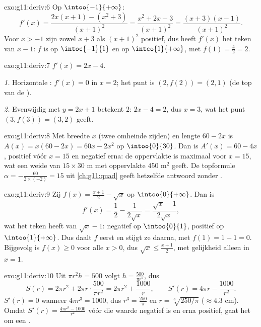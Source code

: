 \begin{solution}{exo:g11:deriv:6}
Op $\intoo{-1}{+\infty}$:
\[
f'(x) = \frac{2x(x+1) - (x^2+3)}{(x+1)^2}
= \frac{x^2 + 2x - 3}{(x+1)^2}
= \frac{(x+3)(x-1)}{(x+1)^2}.
\]
Voor $x > -1$ zijn zowel $x + 3$ als $(x+1)^2$ positief, dus heeft $f'(x)$
het teken van $x - 1$: $f$ is  op $\intoc{-1}{1}$ en  op
$\intco{1}{+\infty}$, met  $f(1) = \frac{4}{2} = 2$.
\end{solution}

\begin{solution}{exo:g11:deriv:7}
$f'(x) = 2x - 4$.

\emph{1.} Horizontale : $f'(x) = 0$ in $x = 2$; het punt is
$(2, f(2)) = (2, 1)$ (de top van de ).

\emph{2.} Evenwijdig met $y = 2x + 1$ betekent  $2$:
$2x - 4 = 2$, dus $x = 3$, wat het punt $(3, f(3)) = (3, 2)$ geeft.
\end{solution}

\begin{solution}{exo:g11:deriv:8}
Met breedte $x$ (twee omheinde zijden) en lengte $60 - 2x$ is
$A(x) = x(60 - 2x) = 60x - 2x^2$ op $\intoo{0}{30}$. Dan is
$A'(x) = 60 - 4x$, positief vóór $x = 15$ en negatief erna: de oppervlakte
is maximaal voor $x = 15$, wat een weide van $15 \times 30$ m met
oppervlakte $450$ m$^2$ geeft. De topformule
$\alpha = -\frac{60}{2 \times (-2)} = 15$ uit \cref{ch:g11:quad} geeft
hetzelfde antwoord zonder .
\end{solution}

\begin{solution}{exo:g11:deriv:9}
Zij $f(x) = \frac{x+1}{2} - \sqrt x$ op $\intoo{0}{+\infty}$. Dan is
\[
f'(x) = \frac12 - \frac{1}{2\sqrt x} = \frac{\sqrt x - 1}{2\sqrt x},
\]
wat het teken heeft van $\sqrt x - 1$: negatief op $\intoo{0}{1}$, positief
op $\intoo{1}{+\infty}$. Dus daalt $f$ eerst en stijgt ze daarna, met
 $f(1) = 1 - 1 = 0$. Bijgevolg is $f(x) \geq 0$ voor alle $x > 0$,
dus $\sqrt x \leq \frac{x+1}{2}$, met gelijkheid alleen in $x = 1$.
\end{solution}

\begin{solution}{exo:g11:deriv:10}
Uit $\pi r^2 h = 500$ volgt $h = \frac{500}{\pi r^2}$, dus
\[
S(r) = 2\pi r^2 + 2\pi r \cdot \frac{500}{\pi r^2}
= 2\pi r^2 + \frac{1000}{r},
\qquad
S'(r) = 4\pi r - \frac{1000}{r^2}.
\]
$S'(r) = 0$ wanneer $4\pi r^3 = 1000$, dus $r^3 = \frac{250}{\pi}$ en
$r = \sqrt[3]{250/\pi}$ ($\approx 4.3$ cm). Omdat
$S'(r) = \frac{4\pi r^3 - 1000}{r^2}$ vóór die waarde negatief is en erna
positief, gaat het om een .
\end{solution}

